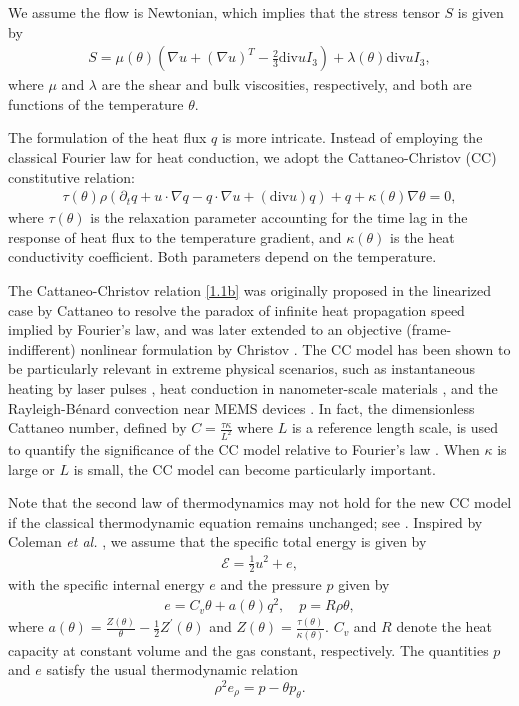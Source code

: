 \documentclass[11pt,reqno]{amsart}
\numberwithin{equation}{section}
\newcommand{\di}{\mathrm{div}}
\begin{document}
We assume the flow is Newtonian, which implies that the stress tensor $S$ is given by
\begin{align}\label{1.1a}
S=\mu(\theta)\left(\nabla u+(\nabla u)^T-\frac{2}{3} \di u I_3\right)+\lambda(\theta) \di u I_3,
\end{align}
where $\mu$ and $\lambda$ are the shear and bulk viscosities, respectively, and both are functions of the temperature $\theta$.

The formulation of the heat flux $q$ is more intricate. Instead of employing the classical Fourier law for heat conduction, we adopt the Cattaneo-Christov (CC) constitutive relation:
\begin{align}\label{1.1b}
\tau (\theta) \rho \left(\partial_t q+u\cdot\nabla q-q\cdot \nabla u+(\di u)q\right)+q+\kappa (\theta)\nabla \theta=0,
\end{align}
where $\tau(\theta)$ is the relaxation parameter accounting for the time lag in the response of heat flux to the temperature gradient, and $\kappa(\theta)$ is the heat conductivity coefficient. Both parameters depend on the temperature.

The Cattaneo-Christov relation \eqref{1.1b} was originally proposed  in the linearized case by Cattaneo \cite{CA} to resolve the paradox of infinite heat propagation speed implied by Fourier's law, and was later extended to an objective (frame-indifferent) nonlinear formulation by Christov \cite{CHR}. The CC model has been shown to be particularly relevant in extreme physical scenarios, such as instantaneous heating by laser pulses \cite{LE08}, heat conduction in nanometer-scale materials \cite{JSA11}, and the Rayleigh-B\'enard convection near MEMS devices \cite{GL03}. In fact, the dimensionless Cattaneo number, defined by $C=\frac{\tau \kappa}{L^2}$ where $L$ is a reference length scale, is used to quantify the significance of the CC model relative to Fourier’s law \cite{KH15}. When $\kappa$ is large or $L$ is small, the CC model can become particularly important.


Note that the second law of thermodynamics may not hold for the new CC model if the classical thermodynamic equation remains unchanged; see \cite{CHO, HR20, HuRa024, MO17}. Inspired by Coleman \textit{et al.} \cite{CHO}, we assume that the specific total energy is given by
\begin{align}\label{1.2}
{\mathcal E}=\frac{1}{2}u^2+e,
\end{align}
with the specific internal energy $e$ and the pressure $p$ given by
\begin{align}\label{1.3}
e=C_v \theta+a(\theta)q^2, \quad p=R \rho \theta,
\end{align}
where $a(\theta)=\frac{Z(\theta)}{\theta}-\frac{1}{2} Z^\prime(\theta)$ and $Z(\theta)=\frac{\tau(\theta)}{\kappa(\theta)}$.
$C_v$ and $R$ denote the heat capacity at constant volume and the gas constant, respectively. The quantities $p$ and $e$ satisfy the usual thermodynamic relation
$$
\rho^2 e_\rho=p-\theta p_\theta.
$$
\end{document}
